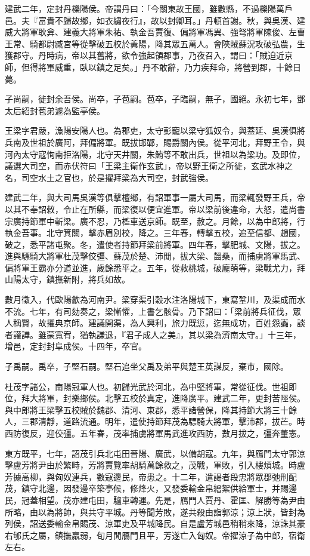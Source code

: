 \begin{pinyinscope}
建武二年，定封丹櫟陽侯。帝謂丹曰：「今關東故王國，雖數縣，不過櫟陽萬戶邑。夫『富貴不歸故鄉，如衣繡夜行』，故以封卿耳。」丹頓首謝。秋，與吳漢、建威大將軍耿弇、建義大將軍朱祐、執金吾賈復、偏將軍馮異、強弩將軍陳俊、左曹王常、騎都尉臧宮等從擊破五校於羛陽，降其眾五萬人。會陝賊蘇況攻破弘農，生獲郡守。丹時病，帝以其舊將，欲令強起領郡事，乃夜召入，謂曰：「賊迫近京師，但得將軍威重，臥以鎮之足矣。」丹不敢辭，乃力疾拜命，將營到郡，十餘日薨。

子尚嗣，徙封余吾侯。尚卒，子苞嗣。苞卒，子臨嗣，無子，國絕。永初七年，鄧太后紹封苞弟遽為監亭侯。

王梁字君嚴，漁陽安陽人也。為郡吏，太守彭寵以梁守狐奴令，與蓋延、吳漢俱將兵南及世祖於廣阿，拜偏將軍。既拔邯鄲，賜爵關內侯。從平河北，拜野王令，與河內太守寇恂南拒洛陽，北守天井關，朱鮪等不敢出兵，世祖以為梁功。及即位，議選大司空，而赤伏符曰「王梁主衛作玄武」，帝以野王衛之所徙，玄武水神之名，司空水土之官也，於是擢拜梁為大司空，封武強侯。

建武二年，與大司馬吳漢等俱擊檀鄉，有詔軍事一屬大司馬，而梁輒發野王兵，帝以其不奉詔敕，令止在所縣，而梁復以便宜進軍。帝以梁前後違命，大怒，遣尚書宗廣持節軍中斬梁。廣不忍，乃檻車送京師。既至，赦之。月餘，以為中郎將，行執金吾事。北守箕關，擊赤眉別校，降之。三年春，轉擊五校，追至信都、趙國，破之，悉平諸屯聚。冬，遣使者持節拜梁前將軍。四年春，擊肥城、文陽，拔之。進與驃騎大將軍杜茂擊佼彊、蘇茂於楚、沛閒，拔大梁、齧桑，而捕虜將軍馬武、偏將軍王霸亦分道並進，歲餘悉平之。五年，從救桃城，破龐萌等，梁戰尤力，拜山陽太守，鎮撫新附，將兵如故。

數月徵入，代歐陽歙為河南尹。梁穿渠引穀水注洛陽城下，東寫鞏川，及渠成而水不流。七年，有司劾奏之，梁慚懼，上書乞骸骨。乃下詔曰：「梁前將兵征伐，眾人稱賢，故擢典京師。建議開渠，為人興利，旅力既愆，迄無成功，百姓怨讟，談者讙譁。雖蒙寬宥，猶執謙退，『君子成人之美』，其以梁為濟南太守。」十三年，增邑，定封封阜成侯。十四年，卒官。

子禹嗣。禹卒，子堅石嗣。堅石追坐父禹及弟平與楚王英謀反，棄市，國除。

杜茂字諸公，南陽冠軍人也。初歸光武於河北，為中堅將軍，常從征伐。世祖即位，拜大將軍，封樂鄉侯。北擊五校於真定，進降廣平。建武二年，更封苦陘侯。與中郎將王梁擊五校賊於魏郡、清河、東郡，悉平諸營保，降其持節大將三十餘人，三郡清靜，道路流通。明年，遣使持節拜茂為驃騎大將軍，擊沛郡，拔芒。時西防復反，迎佼彊。五年春，茂率捕虜將軍馬武進攻西防，數月拔之，彊奔董憲。

東方既平，七年，詔茂引兵北屯田晉陽、廣武，以備胡寇。九年，與鴈門太守郭涼擊盧芳將尹由於繁畤，芳將賈覽率胡騎萬餘救之，茂戰，軍敗，引入樓煩城。時盧芳據高柳，與匈奴連兵，數寇邊民，帝患之。十二年，遣謁者段忠將眾郡弛刑配茂，鎮守北邊，因發邊卒築亭候，修烽火，又發委輸金帛繒絮供給軍士，并賜邊民，冠蓋相望。茂亦建屯田，驢車轉運。先是，鴈門人賈丹、霍匡、解勝等為尹由所略，由以為將帥，與共守平城。丹等聞芳敗，遂共殺由詣郭涼；涼上狀，皆封為列侯，詔送委輸金帛賜茂、涼軍吏及平城降民。自是盧芳城邑稍稍來降，涼誅其豪右郇氏之屬，鎮撫羸弱，旬月閒鴈門且平，芳遂亡入匈奴。帝擢涼子為中郎，宿衛左右。


\end{pinyinscope}
